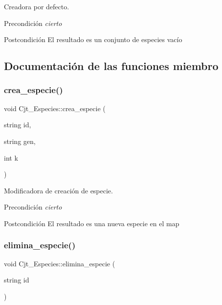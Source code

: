 Creadora por defecto. 

\begin{DoxyPrecond}{Precondición}
{\itshape cierto} 
\end{DoxyPrecond}
\begin{DoxyPostcond}{Postcondición}
El resultado es un conjunto de especies vacío 
\end{DoxyPostcond}


\subsection{Documentación de las funciones miembro}
\mbox{\label{class_cjt___especies_a8c90cec35ff5469f0b8e193308569e4b}} 
\subsubsection{\texorpdfstring{crea\+\_\+especie()}{crea\_especie()}}
{\footnotesize\ttfamily void Cjt\+\_\+\+Especies\+::crea\+\_\+especie (\begin{DoxyParamCaption}\item[{string}]{id,  }\item[{string}]{gen,  }\item[{int}]{k }\end{DoxyParamCaption})}



Modificadora de creación de especie. 

\begin{DoxyPrecond}{Precondición}
{\itshape cierto} 
\end{DoxyPrecond}
\begin{DoxyPostcond}{Postcondición}
El resultado es una nueva especie en el map 
\end{DoxyPostcond}
\mbox{\label{class_cjt___especies_aef76f607ead23a635d7a8b2c9a844327}} 
\subsubsection{\texorpdfstring{elimina\+\_\+especie()}{elimina\_especie()}}
{\footnotesize\ttfamily void Cjt\+\_\+\+Especies\+::elimina\+\_\+especie (\begin{DoxyParamCaption}\item[{string}]{id }\end{DoxyParamCaption})}



